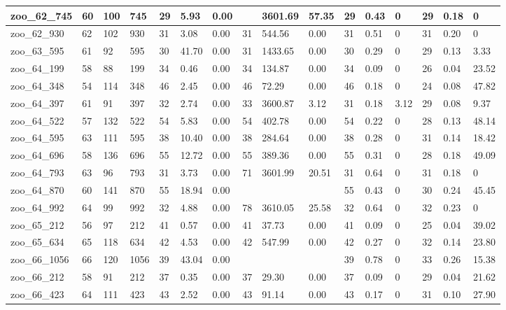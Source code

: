 \begin{landscape}
\begin{longtable}{llllllllllllllll}
zoo\_62\_745 & 60 & 100 & 745 & 29 & 5.93 & 0.00 &  & 3601.69 & 57.35 & 29 & 0.43 & 0 & 29 & 0.18 & 0 \\ \hline 
zoo\_62\_930 & 62 & 102 & 930 & 31 & 3.08 & 0.00 & 31 & 544.56 & 0.00 & 31 & 0.51 & 0 & 31 & 0.20 & 0 \\ \hline 
zoo\_63\_595 & 61 & 92 & 595 & 30 & 41.70 & 0.00 & 31 & 1433.65 & 0.00 & 30 & 0.29 & 0 & 29 & 0.13 & 3.33 \\ \hline 
zoo\_64\_199 & 58 & 88 & 199 & 34 & 0.46 & 0.00 & 34 & 134.87 & 0.00 & 34 & 0.09 & 0 & 26 & 0.04 & 23.52 \\ \hline 
zoo\_64\_348 & 54 & 114 & 348 & 46 & 2.45 & 0.00 & 46 & 72.29 & 0.00 & 46 & 0.18 & 0 & 24 & 0.08 & 47.82 \\ \hline 
zoo\_64\_397 & 61 & 91 & 397 & 32 & 2.74 & 0.00 & 33 & 3600.87 & 3.12 & 31 & 0.18 & 3.12 & 29 & 0.08 & 9.37 \\ \hline 
zoo\_64\_522 & 57 & 132 & 522 & 54 & 5.83 & 0.00 & 54 & 402.78 & 0.00 & 54 & 0.22 & 0 & 28 & 0.13 & 48.14 \\ \hline 
zoo\_64\_595 & 63 & 111 & 595 & 38 & 10.40 & 0.00 & 38 & 284.64 & 0.00 & 38 & 0.28 & 0 & 31 & 0.14 & 18.42 \\ \hline 
zoo\_64\_696 & 58 & 136 & 696 & 55 & 12.72 & 0.00 & 55 & 389.36 & 0.00 & 55 & 0.31 & 0 & 28 & 0.18 & 49.09 \\ \hline 
zoo\_64\_793 & 63 & 96 & 793 & 31 & 3.73 & 0.00 & 71 & 3601.99 & 20.51 & 31 & 0.64 & 0 & 31 & 0.18 & 0 \\ \hline 
zoo\_64\_870 & 60 & 141 & 870 & 55 & 18.94 & 0.00 &  &  &  & 55 & 0.43 & 0 & 30 & 0.24 & 45.45 \\ \hline 
zoo\_64\_992 & 64 & 99 & 992 & 32 & 4.88 & 0.00 & 78 & 3610.05 & 25.58 & 32 & 0.64 & 0 & 32 & 0.23 & 0 \\ \hline 
zoo\_65\_212 & 56 & 97 & 212 & 41 & 0.57 & 0.00 & 41 & 37.73 & 0.00 & 41 & 0.09 & 0 & 25 & 0.04 & 39.02 \\ \hline 
zoo\_65\_634 & 65 & 118 & 634 & 42 & 4.53 & 0.00 & 42 & 547.99 & 0.00 & 42 & 0.27 & 0 & 32 & 0.14 & 23.80 \\ \hline 
zoo\_66\_1056 & 66 & 120 & 1056 & 39 & 43.04 & 0.00 &  &  &  & 39 & 0.78 & 0 & 33 & 0.26 & 15.38 \\ \hline 
zoo\_66\_212 & 58 & 91 & 212 & 37 & 0.35 & 0.00 & 37 & 29.30 & 0.00 & 37 & 0.09 & 0 & 29 & 0.04 & 21.62 \\ \hline 
zoo\_66\_423 & 64 & 111 & 423 & 43 & 2.52 & 0.00 & 43 & 91.14 & 0.00 & 43 & 0.17 & 0 & 31 & 0.10 & 27.90 \\ \hline 

\end{longtable}
\end{landscape}
